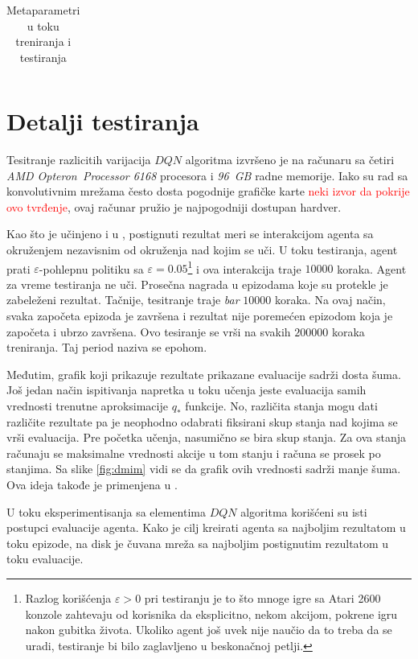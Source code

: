 \begin{table}
\begin{tabularx}{\textwidth}{|l|c|X|}
\end{tabularx}
\caption{Metaparametri u toku treniranja i testiranja}
\label{tbl:metaparametri}
\end{table}

\section{Detalji testiranja}
\label{sec:testiranje}
Tesitranje razlicitih varijacija $DQN$ algoritma izvršeno je na računaru sa četiri {\em AMD Opteron\texttrademark ~Processor 6168} procesora i {\em 96~GB} radne memorije. Iako su rad sa konvolutivnim mrežama često dosta pogodnije grafičke karte \textcolor{red}{neki izvor da pokrije ovo tvrđenje}, ovaj računar pružio je najpogodniji dostupan hardver. 
\par 
Kao što je učinjeno i u \cite{dqn_mnih}, postignuti rezultat meri se interakcijom agenta sa okruženjem nezavisnim od okruženja nad kojim se uči. U toku testiranja, agent prati $\varepsilon$-pohlepnu politiku sa $\varepsilon=0.05$\footnote{Razlog korišćenja $\varepsilon > 0$ pri testiranju je to što mnoge igre sa Atari 2600 konzole zahtevaju od korisnika da eksplicitno, nekom akcijom, pokrene igru nakon gubitka života. Ukoliko agent još uvek nije naučio da to treba da se uradi, testiranje bi bilo zaglavljeno u beskonačnoj petlji.} i ova interakcija traje $10000$ koraka. Agent za vreme testiranja ne uči. Prosečna nagrada u epizodama koje su protekle je zabeleženi rezultat. Tačnije, tesitranje traje {\em bar} $10000$ koraka. Na ovaj način, svaka započeta epizoda je završena i rezultat nije poremećen epizodom koja je započeta i ubrzo završena. Ovo tesiranje se vrši na svakih $200000$ koraka treniranja. Taj period naziva se epohom. 
\par 
Međutim, grafik koji prikazuje rezultate prikazane evaluacije sadrži dosta šuma. Još jedan način ispitivanja napretka u toku učenja jeste evaluacija samih vrednosti trenutne aproksimacije $q_*$ funkcije. No, različita stanja mogu dati različite rezultate pa je neophodno odabrati fiksirani skup stanja nad kojima se vrši evaluacija. Pre početka učenja, nasumično se bira skup stanja. Za ova stanja računaju se maksimalne vrednosti akcije u tom stanju i računa se prosek po stanjima. Sa slike \ref{fig:dmim} vidi se da grafik ovih vrednosti sadrži manje šuma. Ova ideja takođe je primenjena u \cite{dqn_mnih}.
\par 
U toku eksperimentisanja sa elementima $DQN$ algoritma korišćeni su isti postupci evaluacije agenta. Kako je cilj kreirati agenta sa najboljim rezultatom u toku epizode, na disk je čuvana mreža sa najboljim postignutim rezultatom u toku evaluacije.

